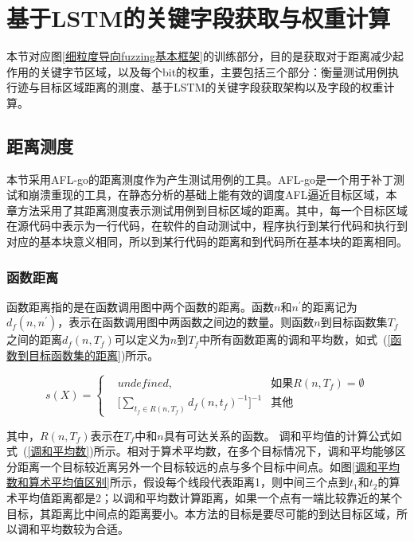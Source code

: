 \section{基于LSTM的关键字段获取与权重计算}
\label{基于LSTM的关键字段获取}

本节对应图\ref{细粒度导向fuzzing基本框架}的训练部分，目的是获取对于距离减少起作用的关键字节区域，以及每个bit的权重，主要包括三个部分：衡量测试用例执行迹与目标区域距离的测度、基于LSTM的关键字段获取架构以及字段的权重计算。

\subsection{距离测度}
\label{距离测度}

本节采用AFL-go的距离测度作为产生测试用例的工具。AFL-go是一个用于补丁测试和崩溃重现的工具，在静态分析的基础上能有效的调度AFL逼近目标区域，本章方法采用了其距离测度表示测试用例到目标区域的距离。其中，每一个目标区域在源代码中表示为一行代码，在软件的自动测试中，程序执行到某行代码和执行到对应的基本块意义相同，所以到某行代码的距离和到代码所在基本块的距离相同。

\subsubsection{函数距离}

函数距离指的是在函数调用图中两个函数的距离。函数$n$和$n^{'}$的距离记为$d_{f}(n,n^{'})$，表示在函数调用图中两函数之间边的数量。则函数$n$到目标函数集$T_f$之间的距离$d_f (n,T_f)$可以定义为$n$到$T_f$中所有函数距离的调和平均数，如式~(\ref{函数到目标函数集的距离})所示。

\begin{equation}\label{函数到目标函数集的距离}
s(X)=\left\{
\begin{aligned}
& undefined, & \text{如果} R(n, T_{f}) = \emptyset \\
& \lbrack \sum_{t_f \in R(n, T_{f})}d_{f}(n,t_{f})^{-1}\rbrack ^{-1} & \text{其他}
\end{aligned}
\right.
\end{equation} 

其中，$R(n,T_{f})$表示在$T_f$中和$n$具有可达关系的函数。
调和平均值的计算公式如式~(\ref{调和平均数})所示。相对于算术平均数，在多个目标情况下，调和平均能够区分距离一个目标较近离另外一个目标较远的点与多个目标中间点。如图\ref{调和平均数和算术平均值区别}所示，假设每个线段代表距离1，则中间三个点到$t_1$和$t_2$的算术平均值距离都是2；以调和平均数计算距离，如果一个点有一端比较靠近的某个目标，其距离比中间点的距离要小。本方法的目标是要尽可能的到达目标区域，所以调和平均数较为合适。


